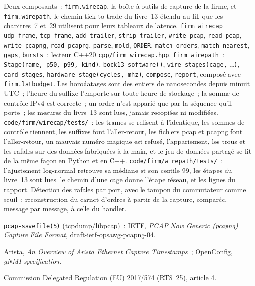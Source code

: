 \begin{build}
 Deux composants~: \texttt{firm.wirecap}, la boîte à outils de capture de la firme, et \texttt{firm.wirepath}, le chemin tick-to-trade du
livre~13 étendu au fil, que les chapitres~7 et~29 utilisent pour leurs tableaux de latence.
 \texttt{firm\_wirecap}~: \texttt{udp\_frame}, \texttt{tcp\_frame}, \texttt{add\_trailer}, \texttt{strip\_trailer},
\texttt{write\_pcap}, \texttt{read\_pcap}, \texttt{write\_pcapng}, \texttt{read\_pcapng}, \texttt{parse}, \texttt{mold}, \texttt{ORDER},
\texttt{match\_orders}, \texttt{match\_nearest}, \texttt{gaps}, \texttt{bursts}~; lecteur C++20 \texttt{cpp/firm\_wirecap.hpp}.
\texttt{firm\_wirepath}~: \texttt{Stage(name, p50, p99, kind)}, \texttt{book13\_software()}, \texttt{wire\_stages(cage, \dots)},
\texttt{card\_stages}, \texttt{hardware\_stage(cycles, mhz)}, \texttt{compose}, \texttt{report}, composé avec \texttt{firm.latbudget}.
 Les horodatages sont des entiers de nanosecondes depuis minuit UTC~; l'heure du suffixe l'emporte sur toute heure de stockage~; la somme de contrôle IPv4 est
correcte~; un ordre n'est apparié que par la séquence qu'il porte~; les mesures du livre~13 sont lues, jamais recopiées ni modifiées.
 \texttt{code/firm/wirecap/tests/}~: les trames se relisent à l'identique, les sommes de contrôle tiennent, les suffixes font l'aller-retour, les fichiers pcap et pcapng
font l'aller-retour, un mauvais numéro magique est refusé, l'appariement, les trous et les rafales sur des données fabriquées à la main, et le jeu de données partagé se lit de la même façon en Python et
en C++. \texttt{code/firm/wirepath/tests/}~: l'ajustement log-normal retrouve sa médiane et son centile 99, les étapes du livre~13 sont lues, le chemin d'une cage
donne l'étape réseau, et les lignes du rapport.
 Détection des rafales par port, avec le tampon du commutateur comme seuil~; reconstruction du carnet d'ordres à partir de la capture, comparée,
message par message, à celle du handler.
\end{build}

\begin{omsources}
\item \texttt{pcap-savefile(5)} (tcpdump/libpcap)~; IETF, \emph{PCAP Now Generic (pcapng) Capture File Format},
draft-ietf-opsawg-pcapng-04.
\item Arista, \emph{An Overview of Arista Ethernet Capture Timestamps}~; OpenConfig, \emph{gNMI specification}.
\item Commission Delegated Regulation (EU) 2017/574 (RTS~25), article 4.
\end{omsources}

